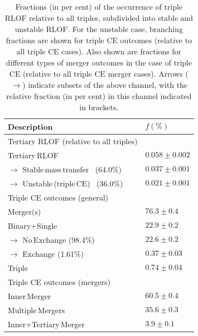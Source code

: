 \documentclass[twocolumn,appendixfloats,tighten]{aastex631}
\begin{document}
\begin{table}
\begin{tabular}{ll}
\toprule 
Description & $f(\%)$ \\
\midrule
Tertiary RLOF (relative to all triples) \\
\midrule
Tertiary\,RLOF & $0.058 \pm 0.002$ \\
$\rightarrow$ Stable\,mass\,transfer \, (64.0\%) & $0.037 \pm 0.001$ \\
$\rightarrow$ Unstable\,(triple\,CE) \, (36.0\%) & $0.021 \pm 0.001$ \\
\midrule
Triple CE outcomes (general) \\
\midrule
Merger(s) & $76.3 \pm 0.4$ \\
Binary+Single & $22.9 \pm 0.2$ \\
$\rightarrow$ No\,Exchange (98.4\%) & $22.6 \pm 0.2$ \\
$\rightarrow$ Exchange (1.61\%) & $0.37 \pm 0.03$ \\
Triple & $0.74 \pm 0.04$ \\
\midrule
Triple CE outcomes (mergers) \\
\midrule
Inner\,Merger & $60.5 \pm 0.4$ \\
Multiple\,Mergers & $35.6 \pm 0.3$ \\
Inner+Tertiary\,Merger & $3.9 \pm 0.1$ \\
\bottomrule
\end{tabular}
\caption{Fractions (in per cent) of the occurrence of triple RLOF relative to all triples, subdivided into stable and unstable RLOF. For the unstable case, branching fractions are shown for triple CE outcomes (relative to all triple CE cases). Also shown are fractions for different types of merger outcomes in the case of triple CE (relative to all triple CE merger cases). Arrows ($\rightarrow$) indicate subsets of the above channel, with the relative fraction (in per cent) in this channel indicated in brackets. }
\label{table:fractions}
\end{table}
\end{document}
